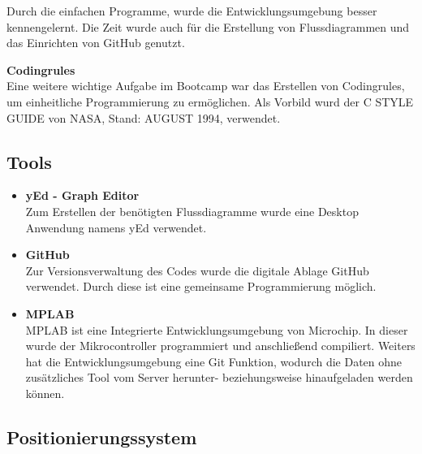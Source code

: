   Durch die einfachen Programme, wurde die Entwicklungsumgebung besser kennengelernt. Die Zeit wurde auch für die Erstellung von Flussdiagrammen und das Einrichten von GitHub genutzt.

  \textbf{Codingrules}\\
  Eine weitere wichtige Aufgabe im Bootcamp war das Erstellen von Codingrules, um einheitliche Programmierung zu ermöglichen.
  Als Vorbild wurd der C STYLE GUIDE von NASA, Stand: AUGUST 1994, verwendet. \cite{NasaCGuide}

  \subsection{Tools}

    \begin{itemize}
      \item \textbf{yEd - Graph Editor}\\
      Zum Erstellen der benötigten Flussdiagramme wurde eine Desktop Anwendung namens yEd verwendet. \cite{Tool_yed}
      \item \textbf{GitHub}\\
      Zur Versionsverwaltung des Codes wurde die digitale Ablage GitHub verwendet. Durch diese ist eine gemeinsame Programmierung möglich.\cite{Tool_github}
      \item \textbf{MPLAB}\\
      MPLAB ist eine Integrierte Entwicklungsumgebung von Microchip. In dieser wurde der Mikrocontroller programmiert und anschließend compiliert. Weiters hat die Entwicklungsumgebung eine Git Funktion, wodurch die Daten ohne zusätzliches Tool vom Server herunter- beziehungsweise hinaufgeladen werden können. \cite{Tool_mplab}
    \end{itemize}

  \subsection{Positionierungssystem}

